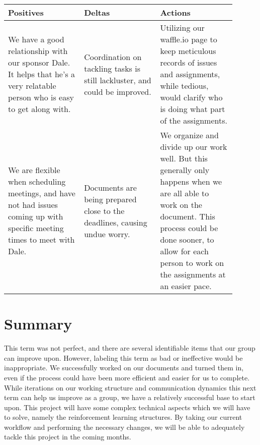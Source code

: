 \documentclass[draftclsnofoot,onecolumn,letterpaper,10pt]{IEEEtran}
\begin{document}
\begin{center}
	\begin{tabular}{p{0.3\linewidth} p{0.3\linewidth} p{0.3\linewidth}}
		\toprule
		\textbf{Positives} & \textbf{Deltas} & \textbf{Actions} \\
		\midrule
		We have a good relationship with our sponsor Dale. It helps that he's a very relatable person who is easy to get along with. & Coordination on tackling tasks is still lackluster, and could be improved. & Utilizing our waffle.io page to keep meticulous records of issues and assignments, while tedious, would clarify who is doing what part of the assignments.\\
		We are flexible when scheduling meetings, and have not had issues coming up with specific meeting times to meet with Dale.& Documents are being prepared close to the deadlines, causing undue worry.& We organize and divide up our work well. But this generally only happens when we are all able to work on the document. This process could be done sooner, to allow for each person to work on the assignments at an easier pace.\\

		\bottomrule
	\end{tabular}
\end{center}


%
%

\section{Summary}
This term was not perfect, and there are several identifiable items that our group can improve upon.
However, labeling this term as bad or ineffective would be inappropriate.
We successfully worked on our documents and turned them in, even if the process could have been more efficient and easier for us to complete.
While iterations on our working structure and communication dynamics this next term can help us improve as a group, we have a relatively successful base to start upon.
This project will have some complex technical aspects which we will have to solve, namely the reinforcement learning structures.
By taking our current workflow and performing the necessary changes, we will be able to adequately tackle this project in the coming months.
\end{document}
